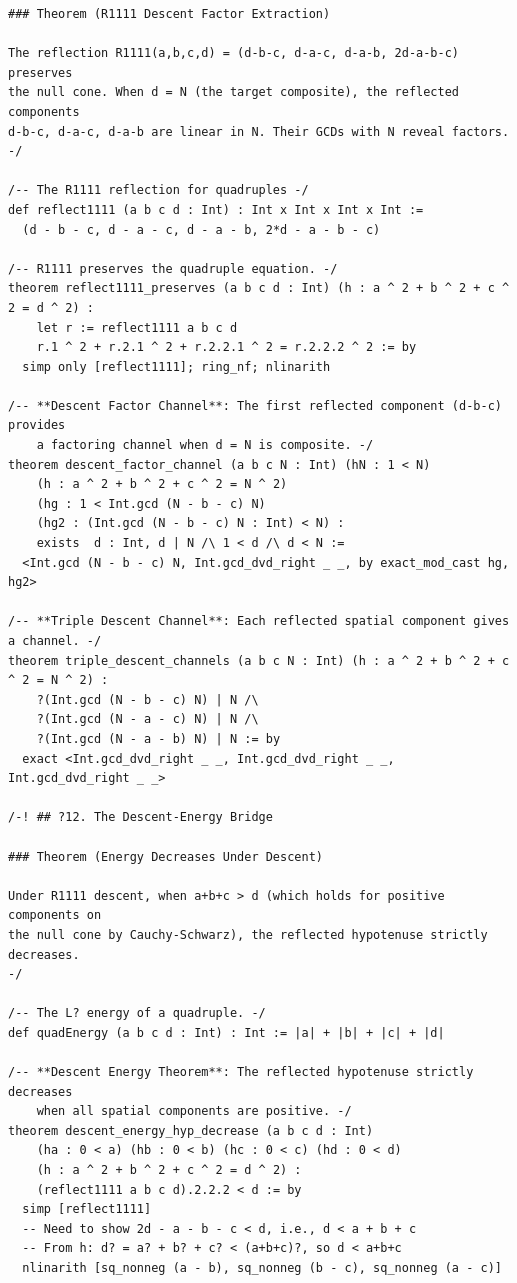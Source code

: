\documentclass[11pt,twoside,openright]{book}
\theoremstyle{definition}
\theoremstyle{remark}
\begin{document}
\begin{lstlisting}[style=lean]
### Theorem (R1111 Descent Factor Extraction)

The reflection R1111(a,b,c,d) = (d-b-c, d-a-c, d-a-b, 2d-a-b-c) preserves
the null cone. When d = N (the target composite), the reflected components
d-b-c, d-a-c, d-a-b are linear in N. Their GCDs with N reveal factors.
-/

/-- The R1111 reflection for quadruples -/
def reflect1111 (a b c d : Int) : Int x Int x Int x Int :=
  (d - b - c, d - a - c, d - a - b, 2*d - a - b - c)

/-- R1111 preserves the quadruple equation. -/
theorem reflect1111_preserves (a b c d : Int) (h : a ^ 2 + b ^ 2 + c ^ 2 = d ^ 2) :
    let r := reflect1111 a b c d
    r.1 ^ 2 + r.2.1 ^ 2 + r.2.2.1 ^ 2 = r.2.2.2 ^ 2 := by
  simp only [reflect1111]; ring_nf; nlinarith

/-- **Descent Factor Channel**: The first reflected component (d-b-c) provides
    a factoring channel when d = N is composite. -/
theorem descent_factor_channel (a b c N : Int) (hN : 1 < N)
    (h : a ^ 2 + b ^ 2 + c ^ 2 = N ^ 2)
    (hg : 1 < Int.gcd (N - b - c) N)
    (hg2 : (Int.gcd (N - b - c) N : Int) < N) :
    exists  d : Int, d | N /\ 1 < d /\ d < N :=
  <Int.gcd (N - b - c) N, Int.gcd_dvd_right _ _, by exact_mod_cast hg, hg2>

/-- **Triple Descent Channel**: Each reflected spatial component gives a channel. -/
theorem triple_descent_channels (a b c N : Int) (h : a ^ 2 + b ^ 2 + c ^ 2 = N ^ 2) :
    ?(Int.gcd (N - b - c) N) | N /\
    ?(Int.gcd (N - a - c) N) | N /\
    ?(Int.gcd (N - a - b) N) | N := by
  exact <Int.gcd_dvd_right _ _, Int.gcd_dvd_right _ _, Int.gcd_dvd_right _ _>

/-! ## ?12. The Descent-Energy Bridge

### Theorem (Energy Decreases Under Descent)

Under R1111 descent, when a+b+c > d (which holds for positive components on
the null cone by Cauchy-Schwarz), the reflected hypotenuse strictly decreases.
-/

/-- The L? energy of a quadruple. -/
def quadEnergy (a b c d : Int) : Int := |a| + |b| + |c| + |d|

/-- **Descent Energy Theorem**: The reflected hypotenuse strictly decreases
    when all spatial components are positive. -/
theorem descent_energy_hyp_decrease (a b c d : Int)
    (ha : 0 < a) (hb : 0 < b) (hc : 0 < c) (hd : 0 < d)
    (h : a ^ 2 + b ^ 2 + c ^ 2 = d ^ 2) :
    (reflect1111 a b c d).2.2.2 < d := by
  simp [reflect1111]
  -- Need to show 2d - a - b - c < d, i.e., d < a + b + c
  -- From h: d? = a? + b? + c? < (a+b+c)?, so d < a+b+c
  nlinarith [sq_nonneg (a - b), sq_nonneg (b - c), sq_nonneg (a - c)]


\end{lstlisting}
\end{document}

